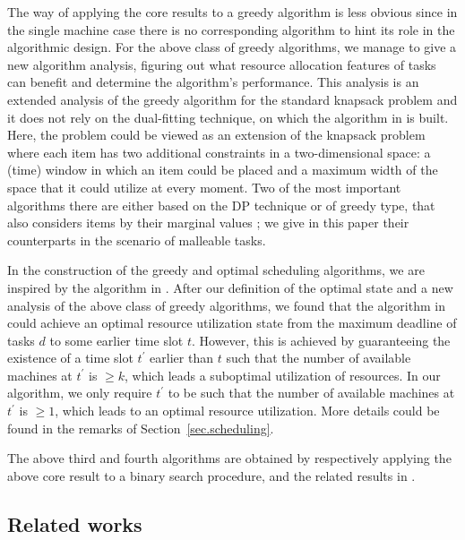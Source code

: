 \documentclass[10pt,journal,compsoc]{IEEEtran}
\begin{document}
The way of applying the core results to a greedy algorithm is less obvious since in the single machine case there is no corresponding algorithm to hint its role in the algorithmic design. For the above class of greedy algorithms, we manage to give a new algorithm analysis, figuring out what resource allocation features of tasks can benefit and determine the algorithm's performance. This analysis is an extended analysis of the greedy algorithm for the standard knapsack problem \cite{Brassard} and it does not rely on the dual-fitting technique, on which the algorithm in \cite{Jain} is built.
Here, the problem could be viewed as an extension of the knapsack problem where each item has two additional constraints in a two-dimensional space: a (time) window in which an item could be placed and a maximum width of the space that it could utilize at every moment. Two of the most important algorithms there are either based on the DP technique or of greedy type, that also considers items by their marginal values \cite{Brassard}; we give in this paper their counterparts in the scenario of malleable tasks.


In the construction of the greedy and optimal scheduling algorithms, we are inspired by the algorithm in \cite{Jain}. After our definition of the optimal state and a new analysis of the above class of greedy algorithms, we found that the algorithm in \cite{Jain} could achieve an optimal resource utilization state from the maximum deadline of tasks $d$ to some earlier time slot $t$. However, this is achieved by guaranteeing the existence of a time slot $t^{\prime}$ earlier than $t$ such that the number of available machines at $t^{\prime}$ is $\geq k$, which leads a suboptimal utilization of resources. In our algorithm, we only require $t^{\prime}$ to be such that the number of available machines at $t^{\prime}$ is $\geq 1$, which leads to an optimal resource utilization. More details could be found in the remarks of Section~\ref{sec.scheduling}.


The above third and fourth algorithms are obtained by respectively applying the above core result to a binary search procedure, and the related results in \cite{Nagarajan}.













\subsection{Related works}
\label{sec.related-work}
\end{document}
